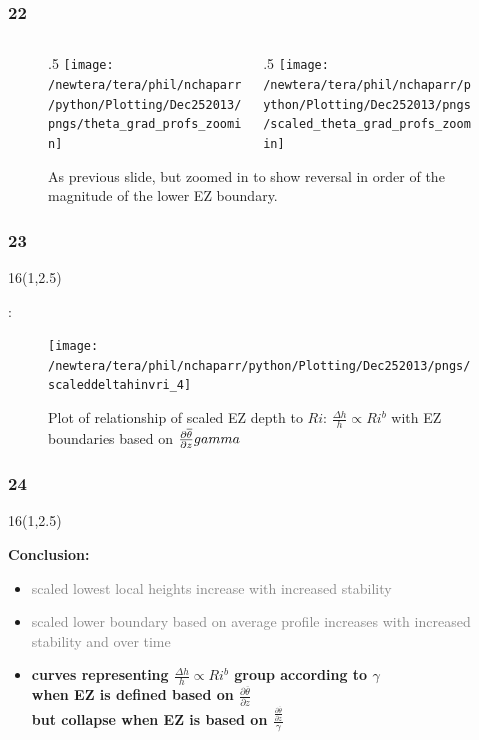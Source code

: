\documentclass{beamer}
\newcommand\FrameText[1]{
\begin{textblock}{16}(1,2.5)
\raggedright #1
\end{textblock}}
\begin{document}
\begin{frame}
\frametitle{22}
\fontsize{12pt}{7.2}\selectfont
\begin{figure}
\begin{columns}[T]
   \begin{column}{.5\textwidth}
   \texttt{[image: /newtera/tera/phil/nchaparr/python/Plotting/Dec252013/pngs/theta\_grad\_profs\_zoomin]} 
   \end{column} 
   
   \begin{column}{.5\textwidth}
    \texttt{[image: /newtera/tera/phil/nchaparr/python/Plotting/Dec252013/pngs/scaled\_theta\_grad\_profs\_zoomin]}
   \end{column}     
\end{columns}
\caption{As previous slide, but zoomed in to show reversal in order of the magnitude of the lower EZ boundary.}
\end{figure}
\end{frame}

\begin{frame}
\frametitle{23}
\fontsize{12pt}{7.2}\selectfont
\FrameText{:
}
\begin{figure}
\centering
\texttt{[image: /newtera/tera/phil/nchaparr/python/Plotting/Dec252013/pngs/scaleddeltahinvri\_4]}
\caption{Plot of relationship of scaled EZ depth to $Ri$: $\frac{\Delta h}{h} \propto Ri ^{b}$ with EZ boundaries based on $\frac{\partial \overline{\theta}}{\partial z}\/gamma$}

\end{figure}

\end{frame}

\begin{frame}
\frametitle{24}
\FrameText{\bf{\large Conclusion}:
\vspace{5mm}
\begin{itemize}
\item \textcolor{gray}{scaled lowest local heights increase with increased stability}
\vspace{5mm}
\item \textcolor{gray}{scaled lower boundary based on average profile increases with increased stability and over time}
\vspace{5mm}
\item \bf{\large curves representing  $\frac{\Delta h}{h} \propto Ri ^{b}$ group according to $\gamma$\\
when EZ is defined based on $\frac{\partial \overline{\theta}}{\partial z}$\\
but collapse when EZ is based on $\frac{\frac{\partial \overline{\theta}}{\partial z}}{\gamma}$} 
\end{itemize}
}
\end{frame}
\end{document}
